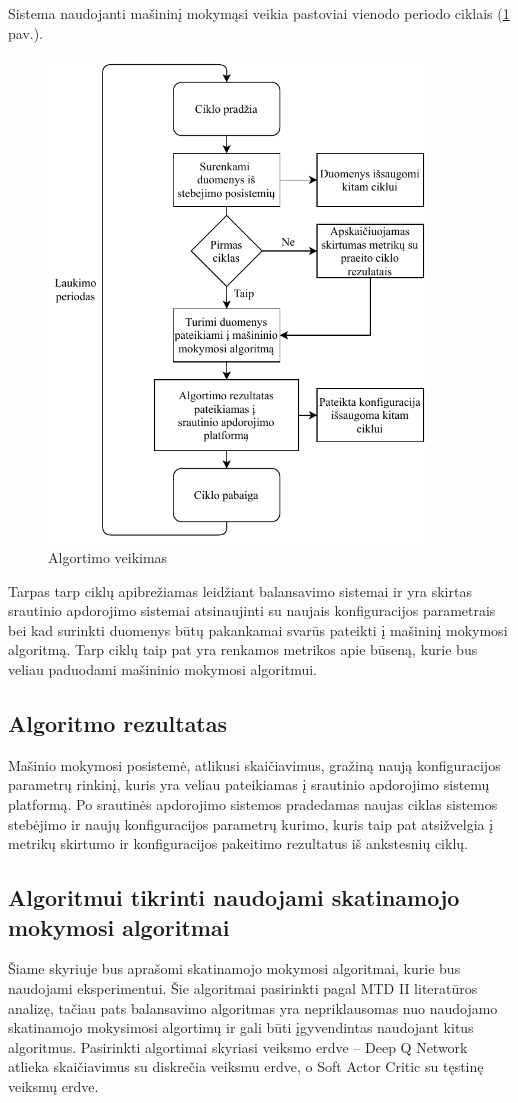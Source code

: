 \documentclass{VUMIFPSbakalaurinis}
\begin{document}
Sistema naudojanti mašininį mokymąsi veikia pastoviai vienodo periodo ciklais (\ref{veikimas} pav.). 
\begin{figure}[H]
    \centering
    \includegraphics[width=10cm]{img/AlgoritmoVeikimas.pdf}
    \caption{Algortimo veikimas}
    \label{veikimas}
\end{figure} 
Tarpas tarp ciklų apibrežiamas leidžiant balansavimo sistemai ir yra skirtas srautinio apdorojimo sistemai atsinaujinti su naujais konfiguracijos parametrais bei kad surinkti duomenys būtų pakankamai svarūs pateikti į mašininį mokymosi algoritmą.
Tarp ciklų taip pat yra renkamos metrikos apie būseną, kurie bus veliau paduodami mašininio mokymosi algoritmui.

\subsection{Algoritmo rezultatas}
Mašinio mokymosi posistemė, atlikusi skaičiavimus, gražiną naują konfiguracijos parametrų rinkinį, kuris yra veliau pateikiamas į srautinio apdorojimo sistemų platformą. Po srautinės apdorojimo sistemos pradedamas naujas ciklas sistemos stebėjimo ir naujų konfiguracijos parametrų kurimo, kuris taip pat atsižvelgia į metrikų skirtumo ir konfiguracijos pakeitimo rezultatus iš  ankstesnių ciklų.

\subsection{Algoritmui tikrinti naudojami skatinamojo mokymosi algoritmai}
Šiame skyriuje bus aprašomi skatinamojo mokymosi algoritmai, kurie bus naudojami eksperimentui. Šie algoritmai pasirinkti pagal MTD II literatūros analizę, tačiau pats balansavimo algoritmas yra nepriklausomas nuo naudojamo skatinamojo mokysimosi algortimų ir gali būti įgyvendintas naudojant kitus algoritmus. Pasirinkti algortimai skyriasi veiksmo erdve – Deep Q Network atlieka skaičiavimus su diskrečia veiksmu erdve, o Soft Actor Critic su tęstinę veiksmų erdve. 
\end{document}
